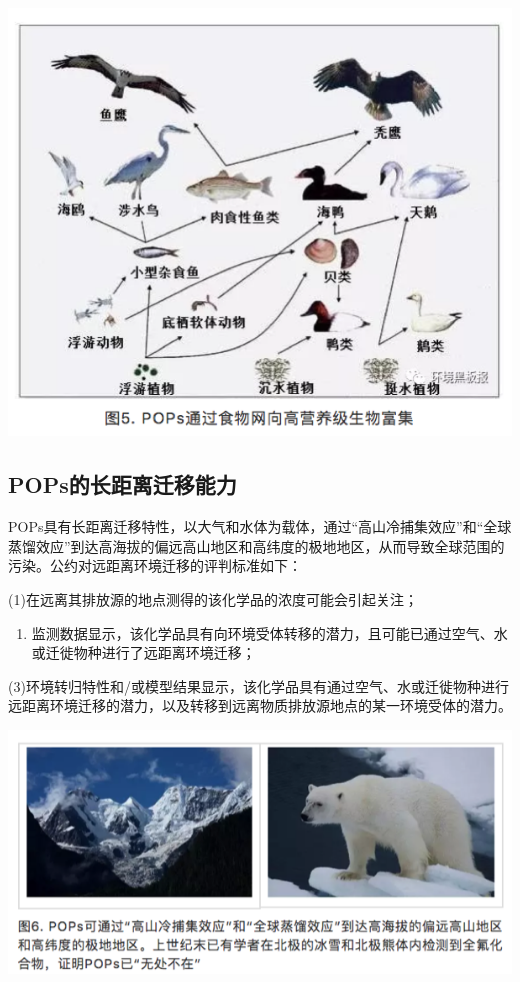 \documentclass[
]{book}
\providecommand{\tightlist}{%
  \setlength{\itemsep}{0pt}\setlength{\parskip}{0pt}}
\begin{document}
\includegraphics[width=8.33in]{images/gongyue5}

\hypertarget{popsux7684ux957fux8dddux79bbux8fc1ux79fbux80fdux529b}{%
\subsection{POPs的长距离迁移能力}\label{popsux7684ux957fux8dddux79bbux8fc1ux79fbux80fdux529b}}

POPs具有长距离迁移特性，以大气和水体为载体，通过``高山冷捕集效应''和``全球蒸馏效应''到达高海拔的偏远高山地区和高纬度的极地地区，从而导致全球范围的污染。公约对远距离环境迁移的评判标准如下：

(1)在远离其排放源的地点测得的该化学品的浓度可能会引起关注；

\begin{enumerate}
\def\labelenumi{(\arabic{enumi})}
\setcounter{enumi}{1}
\tightlist
\item
  监测数据显示，该化学品具有向环境受体转移的潜力，且可能已通过空气、水或迁徙物种进行了远距离环境迁移；
\end{enumerate}

(3)环境转归特性和/或模型结果显示，该化学品具有通过空气、水或迁徙物种进行远距离环境迁移的潜力，以及转移到远离物质排放源地点的某一环境受体的潜力。

\includegraphics[width=8.33in]{images/gongyue6}
\end{document}
